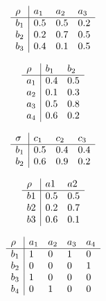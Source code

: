 \documentclass[24pt,pdf,hyperref={unicode},aspectratio=169]{beamer}
\begin{document}
\begin{frame}

$$
\begin{array}{l|l l l}
\rho & a_1 & a_2 & a_3 \\
\hline
b_1  & 0.5 & 0.5 & 0.2 \\
b_2 & 0.2 & 0.7 & 0.5 \\
b_3 & 0.4 & 0.1 & 0.5 \\
\end{array}
$$

\end{frame}

\begin{frame}

$$
\begin{array}{l| l l}
 \rho & b_1 & b_2 \\
 \hline
    a_1 & 0.4 & 0.5 \\
    a_2 & 0.1 & 0.3 \\
    a_3 & 0.5 & 0.8 \\
    a_4 & 0.6 & 0.2 \\
\end{array}
$$

$$
\begin{array}{l | l l l}
    \sigma & c_1 & c_2 & c_3 \\
    \hline
    b_1 & 0.5 & 0.4 & 0.4 \\
    b_2 & 0.6 & 0.9 & 0.2 \\
\end{array}
$$

\end{frame}

\begin{frame}
$$
\begin{array}{l |l l}
\rho & a1 & a2 \\
\hline
    b1 & 0.5 & 0.5 \\
    b2 & 0.2 & 0.7 \\
    b3 & 0.6 & 0.1
\end{array}
$$

\end{frame}

\begin{frame}
$$
\begin{array}{l|l l l l}
    \rho & a_1 & a_2 & a_3 & a_4 \\
    \hline
    b_1 & 1 & 0 & 1 & 0 \\
    b_2 & 0 & 0 & 0 & 1 \\
    b_3 & 1 & 0 & 0 & 0 \\
    b_4 & 0 & 1 & 0 & 0 \\
\end{array}
$$
\end{frame}
\end{document}
